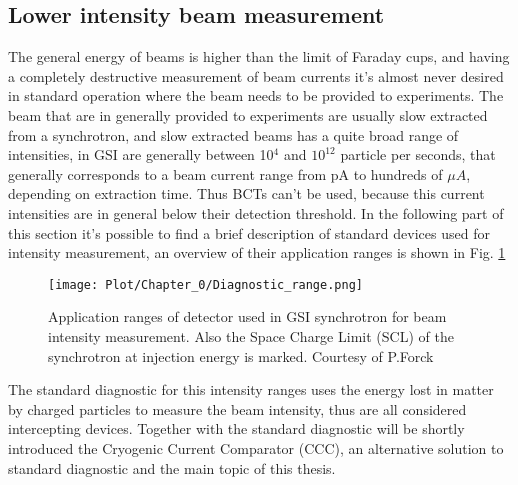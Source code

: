 \documentclass[12pt,a4paper]{report}
\begin{document}
	\subsection{Lower intensity beam measurement}
	The general energy of beams is higher than the limit of Faraday cups, and having a completely destructive measurement of beam currents it's almost never desired in standard operation where the beam needs to be provided to experiments. The beam that are in generally provided to experiments are usually slow extracted from a synchrotron, and slow extracted beams has a quite broad range of intensities, in GSI are generally between 10$^4$ and $10^{12}$ particle per seconds, that generally corresponds to a beam current range from pA to hundreds of $\mu A$, depending on extraction time. Thus BCTs can't be used, because this current intensities are in general below their detection threshold. In the following part of this section it's possible to find a brief description of standard devices used for intensity measurement, an overview of their application ranges is shown in Fig. \ref{Ranges}
	\begin{figure} [H]
		\centering
		\texttt{[image: Plot/Chapter\_0/Diagnostic\_range.png]}
		\caption{\small{Application ranges of detector used in GSI synchrotron for beam intensity measurement. Also the Space Charge Limit (SCL) of the synchrotron at injection energy is marked. Courtesy of P.Forck \cite{Fork}}}
		\label{Ranges}
	\end{figure}
	The standard diagnostic for this intensity ranges uses the energy lost in matter by charged particles to measure the beam intensity, thus are all considered intercepting devices. Together with the standard diagnostic will be shortly introduced the Cryogenic Current Comparator (CCC), an alternative solution to standard diagnostic and the main topic of this thesis.
\end{document}
